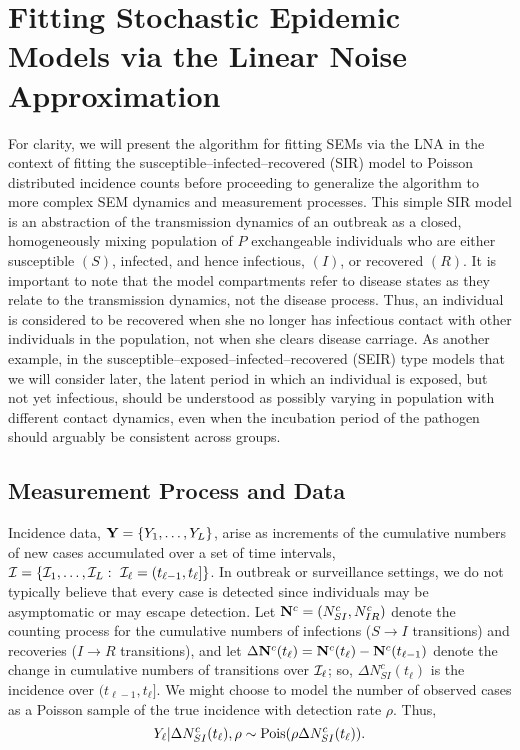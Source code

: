 \section{Fitting Stochastic Epidemic Models via the Linear Noise Approximation}
\label{sec:lna_methods}

For clarity, we will present the algorithm for fitting SEMs via the LNA in the context of fitting the susceptible--infected--recovered (SIR) model to Poisson distributed incidence counts before proceeding to generalize the algorithm to more complex SEM dynamics and measurement processes. This simple SIR model is an abstraction of the transmission dynamics of an outbreak as a closed, homogeneously mixing population of $ P $ exchangeable individuals who are either susceptible $ (S) $, infected, and hence infectious, $ (I) $, or recovered $ (R) $. It is important to note that the model compartments refer to disease states as they relate to the transmission dynamics, not the disease process. Thus, an individual is considered to be recovered when she no longer has infectious contact with other individuals in the population, not when she clears disease carriage. As another example, in the susceptible--exposed--infected--recovered (SEIR) type models that we will consider later, the latent period in which an individual is exposed, but not yet infectious, should be understood as possibly varying in population with different contact dynamics, even when the incubation period of the pathogen should arguably be consistent across groups.

\subsection{Measurement Process and Data}
\label{subsec:lna_measproc}
Incidence data, $ \mathbf{Y} = \lbrace Y_1,\dots,Y_L\rbrace $,  arise as increments of the cumulative numbers of new cases accumulated over a set of time intervals, $ \mathcal{I} = \lbrace\mathcal{I}_1,\dots,\mathcal{I}_L:\ \mathcal{I}_\ell = (t_{\ell-1},t_\ell]\rbrace $. In outbreak or surveillance settings, we do not typically believe that every case is detected since individuals may be asymptomatic or may escape detection. Let $ \mathbf{N}^c = (N^c_{SI}, N^c_{IR}) $ denote the counting process for the cumulative numbers of infections ($ S\rightarrow I $ transitions) and recoveries ($ I\rightarrow R $ transitions), and let $ \Delta \mathbf{N}^c(t_\ell) = \mathbf{N}^c(t_\ell) - \mathbf{N}^c(t_{\ell-1})$ denote the change in cumulative numbers of transitions over $ \mathcal{I}_\ell $; so, $ \Delta N^c_{SI}(t_\ell)$ is the incidence over $ (t_{\ell-1},t_\ell] $. We might choose to model the number of observed cases as a Poisson sample of the true incidence with detection rate $ \rho $. Thus,
\begin{equation}
Y_\ell|\Delta N^c_{SI}(t_\ell),\rho \sim \mathrm{Pois}(\rho\Delta N^c_{SI}(t_\ell)).
\end{equation}

